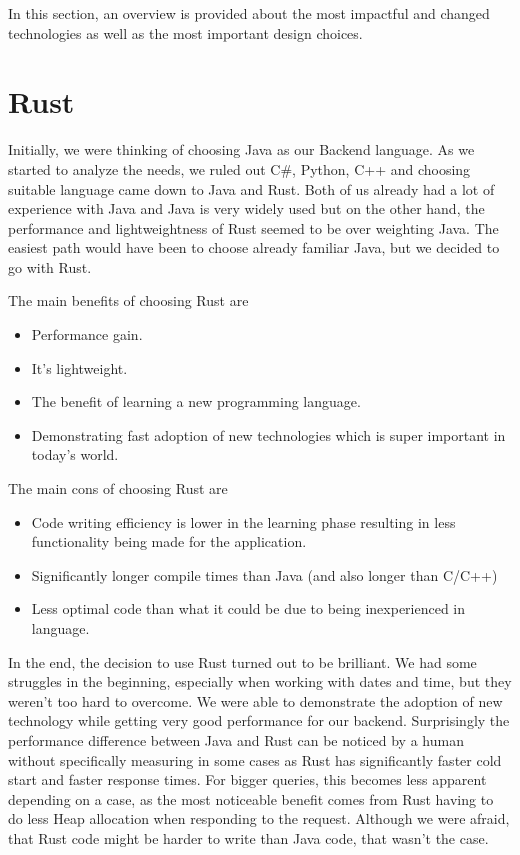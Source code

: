 In this section, an overview is provided about the most impactful and changed technologies as well as the most important design choices.

\section{Rust}\label{sec:rust}
Initially, we were thinking of choosing Java as our Backend language.
As we started to analyze the needs, we ruled out C\#, Python, C++ and choosing suitable language came down to Java and Rust.
Both of us already had a lot of experience with Java and Java is very widely used but on the other hand, the performance and lightweightness of Rust seemed to be over weighting Java.
The easiest path would have been to choose already familiar Java, but we decided to go with Rust.

The main benefits of choosing Rust are
\begin{itemize}
    \item Performance gain.
    \item It's lightweight.
    \item The benefit of learning a new programming language.
    \item Demonstrating fast adoption of new technologies which is super important in today's world.
\end{itemize}

The main cons of choosing Rust are
\begin{itemize}
    \item Code writing efficiency is lower in the learning phase resulting in less functionality being made for the application.
    \item Significantly longer compile times than Java (and also longer than C/C++)
    \item Less optimal code than what it could be due to being inexperienced in language.
\end{itemize}

In the end, the decision to use Rust turned out to be brilliant.
We had some struggles in the beginning, especially when working with dates and time, but they weren't too hard to overcome.
We were able to demonstrate the adoption of new technology while getting very good performance for our backend.
Surprisingly the performance difference between Java and Rust can be noticed by a human without specifically measuring in some cases
as Rust has significantly faster cold start and faster response times.
For bigger queries, this becomes less apparent depending on a case, as the most noticeable benefit comes from Rust
having to do less Heap allocation when responding to the request.
Although we were afraid, that Rust code might be harder to write than Java code, that wasn't the case.

